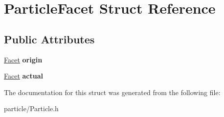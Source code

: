 \hypertarget{struct_particle_facet}{}\section{Particle\+Facet Struct Reference}
\label{struct_particle_facet}
\subsection*{Public Attributes}
\begin{DoxyCompactItemize}
\item 
\mbox{\label{struct_particle_facet_a5aa003b1b0af6628c8553cb30667570f}} 
\mbox{\hyperlink{class_facet}{Facet}} {\bfseries origin}
\item 
\mbox{\label{struct_particle_facet_afffaafe6140078c265ec65c984096b78}} 
\mbox{\hyperlink{class_facet}{Facet}} {\bfseries actual}
\end{DoxyCompactItemize}


The documentation for this struct was generated from the following file\+:\begin{DoxyCompactItemize}
\item 
particle/Particle.\+h\end{DoxyCompactItemize}
